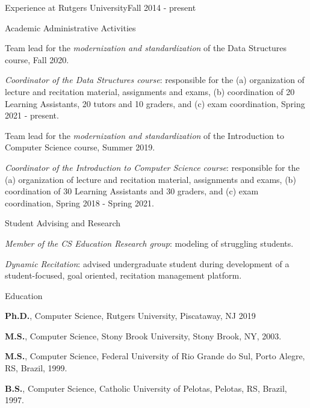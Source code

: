\documentclass{resume}
\begin{document}
\begin{rSection}{Experience at Rutgers University}{Fall 2014 - present}{}
     \begin{rSubsection}{Academic Administrative Activities}{}{}{}
     \item Team lead for the {\em modernization and standardization} of the
       Data Structures course, Fall 2020.
     \item {\em Coordinator of the Data Structures course}:
      responsible for the (a) organization of lecture and recitation
      material, assignments and exams, (b) coordination of 20 Learning
      Assistants, 20 tutors and 10 graders, and (c) exam coordination, Spring 2021 - present.
    \item Team lead for the {\em modernization and standardization} of the
      Introduction to Computer Science course, Summer 2019.
    \item {\em Coordinator of the Introduction to Computer Science course}:
      responsible for the (a) organization of lecture and recitation
      material, assignments and exams, (b) coordination of 30 Learning
      Assistants and 30 graders, and (c) exam coordination, Spring 2018 - Spring 2021.
    \end{rSubsection}

    \begin{rSubsection}{Student Advising and Research}{}{}{}
      \item {\em Member of the CS Education Research group}: modeling
        of struggling students.
      \item {\em Dynamic Recitation}: advised undergraduate student
        during development of a student-focused, goal oriented,
        recitation management platform.
    \end{rSubsection}
  \end{rSection}

  
\begin{rSection}{Education}
  \begin{rSubsection}{}{}{}{}
  \item {\bf Ph.D.}, Computer Science, Rutgers University, Piscataway, NJ 2019
  \item {\bf M.S.}, Computer Science, Stony Brook University, Stony Brook, NY, 2003.
  \item {\bf M.S.}, Computer Science, Federal University of Rio Grande do Sul, Porto Alegre, RS, Brazil, 1999.
  \item {\bf B.S.}, Computer Science, Catholic University of Pelotas, Pelotas, RS, Brazil, 1997.
  \end{rSubsection}
\end{rSection}
\end{document}

